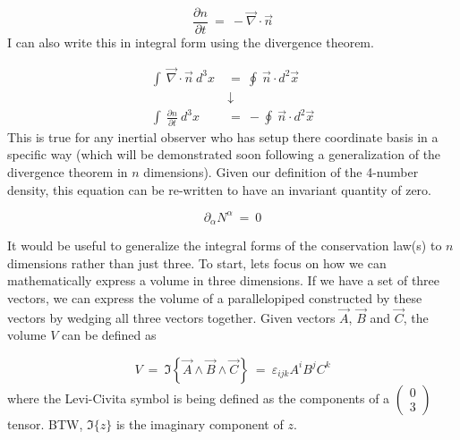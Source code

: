 \begin{equation}
  \frac{\partial n}{\partial t}\ =\ -\vec{\nabla}\cdot\vec{n}
\end{equation}
I can also write this in integral form using the divergence theorem.

\begin{equation}
  \begin{aligned}
    \int\ \vec{\nabla}\cdot\vec{n}\ d^3x\ &=\ \oint\ \vec{n}\cdot d^2\vec{x}\ \\
    &\downarrow \\
    \int\ \frac{\partial n}{\partial t}\ d^3x\ &=\ -\oint\ \vec{n}\cdot d^2\vec{x}
  \end{aligned}
\end{equation}
This is true for any inertial observer who has setup there coordinate basis in a specific way (which will be demonstrated soon following a generalization of the divergence theorem in $n$ dimensions).  Given our definition of the 4-number density, this equation can be re-written to have an invariant quantity of zero.

\begin{equation}
  \partial_{\alpha}N^{\alpha}\ =\ 0
\end{equation}

\hskip 25pt It would be useful to generalize the integral forms of the conservation law(s) to $n$ dimensions rather than just three.  To start, lets focus on how we can mathematically express a volume in three dimensions.  If we have a set of three vectors, we can express the volume of a parallelopiped constructed by these vectors by wedging all three vectors together.  Given vectors $\vec{A}$, $\vec{B}$ and $\vec{C}$, the volume $V$ can be defined as

\begin{equation}
  V\ =\ \Im\left \{\vec{A}\wedge\vec{B}\wedge\vec{C}\right \}\ =\ \varepsilon_{ijk}A^iB^jC^k
\end{equation}
where the Levi-Civita symbol is being defined as the components of a $\begin{pmatrix}0\\ 3\end{pmatrix}$ tensor.  BTW, $\Im\{z\}$ is the imaginary component of $z$.
  

